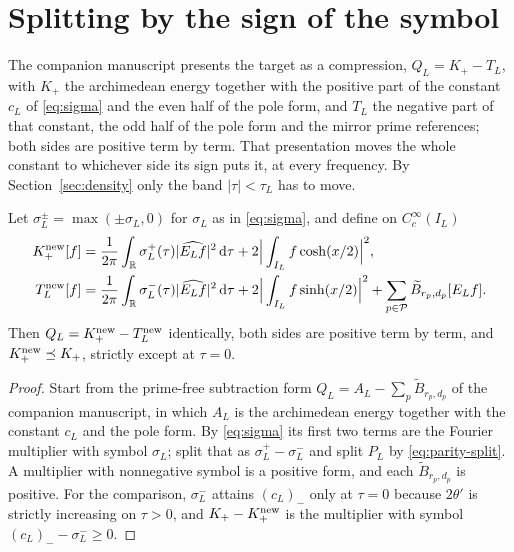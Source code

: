 \section{Splitting by the sign of the symbol}\label{sec:compression}
The companion manuscript presents the target as a compression, $Q_L=K_+-T_L$,
with $K_+$ the archimedean energy together with the positive part of the
constant $c_L$ of \eqref{eq:sigma} and the even half of the pole form, and $T_L$
the negative part of that constant, the odd half of the pole form and the mirror
prime references; both sides are positive term by term. That presentation moves
the whole constant to whichever side its sign puts it, at every frequency. By
Section~\ref{sec:density} only the band $|\tau|<\tau_L$ has to move.

\begin{proposition}\label{prop:symbol-split}
Let $\sigma_L^\pm=\max(\pm\sigma_L,0)$ for $\sigma_L$ as in \eqref{eq:sigma},
and define on $C_c^\infty(I_L)$
\begin{align}
 K_+^{\rm new}[f]&=\frac1{2\pi}\int_\mathbb R\sigma_L^+(\tau)|\widehat{E_Lf}|^2\,\mathrm d\tau
  +2\Big|\int_{I_L}f\cosh(x/2)\Big|^2,\label{eq:source-new}\\
 T_L^{\rm new}[f]&=\frac1{2\pi}\int_\mathbb R\sigma_L^-(\tau)|\widehat{E_Lf}|^2\,\mathrm d\tau
  +2\Big|\int_{I_L}f\sinh(x/2)\Big|^2+\sum_{p\in\mathcal P}\widetilde B_{r_p,d_p}[E_Lf].
 \label{eq:subtracted-new}
\end{align}
Then $Q_L=K_+^{\rm new}-T_L^{\rm new}$ identically, both sides are positive term
by term, and $K_+^{\rm new}\preceq K_+$, strictly except at $\tau=0$.
\end{proposition}
\begin{proof}
Start from the prime-free subtraction form $Q_L=A_L-\sum_p\widetilde B_{r_p,d_p}$
of the companion manuscript, in which $A_L$ is the archimedean energy together
with the constant $c_L$ and the pole form. By \eqref{eq:sigma} its first two
terms are the Fourier multiplier with symbol $\sigma_L$; split that as
$\sigma_L^+-\sigma_L^-$ and split $P_L$ by \eqref{eq:parity-split}. A multiplier
with nonnegative symbol is a positive form, and each $\widetilde B_{r_p,d_p}$ is
positive. For the comparison, $\sigma_L^-$ attains $(c_L)_-$ only at $\tau=0$
because $2\theta'$ is strictly increasing on $\tau>0$, and $K_+-K_+^{\rm new}$ is
the multiplier with symbol $(c_L)_--\sigma_L^-\geq0$.
\end{proof}

